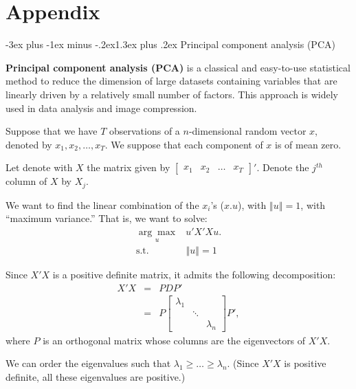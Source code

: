 \documentclass[
  11pt,
]{book}
\makeatletter
\renewcommand\section{\@startsection{section}{1}{\z@}
  {-3ex plus -1ex minus -.2ex}{1.3ex plus .2ex}
  {\normalfont\Large\bfseries\color{TextbookInk}}}
\theoremstyle{definition}
\theoremstyle{definition}
\theoremstyle{definition}
\theoremstyle{definition}
\theoremstyle{remark}
\makeatother
\begin{document}
\chapter{Appendix}\label{append}

\section{Principal component analysis (PCA)}\label{PCAapp}

\textbf{Principal component analysis (PCA)} is a classical and easy-to-use statistical method to reduce the dimension of large datasets containing variables that are linearly driven by a relatively small number of factors. This approach is widely used in data analysis and image compression.

Suppose that we have \(T\) observations of a \(n\)-dimensional random vector \(x\), denoted by \(x_{1},x_{2},\ldots,x_{T}\). We suppose that each component of \(x\) is of mean zero.

Let denote with \(X\) the matrix given by \(\left[\begin{array}{cccc}
x_{1} & x_{2} & \ldots & x_{T}\end{array}\right]'\). Denote the \(j^{th}\) column of \(X\) by \(X_{j}\).

We want to find the linear combination of the \(x_{i}\)'s (\(x.u\)), with \(\left\Vert u\right\Vert =1\), with ``maximum variance.'' That is, we want to solve:
\begin{equation}
\begin{array}{clll}
\underset{u}{\arg\max} & u'X'Xu. \\
\mbox{s.t. } & \left\Vert u \right\Vert =1
\end{array}\label{eq:PCA11}
\end{equation}

Since \(X'X\) is a positive definite matrix, it admits the following decomposition:
\begin{eqnarray*}
X'X & = & PDP'\\
& = & P\left[\begin{array}{ccc}
\lambda_{1}\\
& \ddots\\
&  & \lambda_{n}
\end{array}\right]P',
\end{eqnarray*}
where \(P\) is an orthogonal matrix whose columns are the eigenvectors of \(X'X\).

We can order the eigenvalues such that \(\lambda_{1}\geq\ldots\geq\lambda_{n}\). (Since \(X'X\) is positive definite, all these eigenvalues are positive.)
\end{document}

